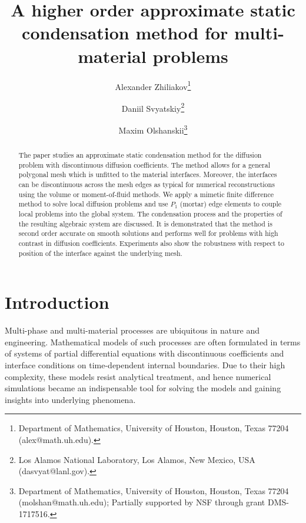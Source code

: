 \documentclass[12pt]{article}
\newcommand{\Sasha}[1]{\colorbox{Cyan}{\textbf{Sasha}:} #1}
\begin{document}
	
\title{A higher order approximate static condensation method for multi-material problems}
\author{
Alexander Zhiliakov\thanks{Department of Mathematics, University of Houston, Houston, Texas 77204 (alex@math.uh.edu).}
\and Daniil Svyatskiy\thanks{Los Alamos National Laboratory, Los Alamos,
New Mexico, USA (dasvyat@lanl.gov).}
\and
Maxim Olshanskii\thanks{Department of Mathematics, University of Houston, Houston, Texas 77204 (molshan@math.uh.edu); Partially supported by NSF through grant  DMS-1717516.}
}

\maketitle

\let\oldtabular\tabular
\renewcommand{\tabular}[1][1.5]{\def\arraystretch{#1}\oldtabular}


\begin{abstract}
The paper studies an approximate static condensation method for the diffusion problem with discontinuous diffusion coefficients. The method allows for a general polygonal mesh which is unfitted to the material interfaces. Moreover, the interfaces can be discontinuous across the mesh edges as typical for numerical reconstructions using the volume or moment-of-fluid methods.  We apply a mimetic finite difference method to solve local diffusion problems and use $P_1$ (mortar) edge elements to couple local problems into the global system. The condensation process and the properties of the resulting algebraic system are discussed. It is demonstrated that the method is second order accurate on smooth solutions and performs well for problems with high contrast in diffusion coefficients. Experiments also show the robustness with respect to position of the interface against the underlying mesh.
\end{abstract}


\section{Introduction}
 Multi-phase and multi-material processes are ubiquitous in nature and engineering.
 Mathematical models of such processes are often formulated in terms of systems of partial differential equations with discontinuous coefficients and interface conditions on time-dependent internal boundaries.
 Due to their high complexity, these models   resist analytical treatment, and hence numerical simulations became an indispensable tool for solving the models and gaining insights into underlying phenomena.
\end{document}
